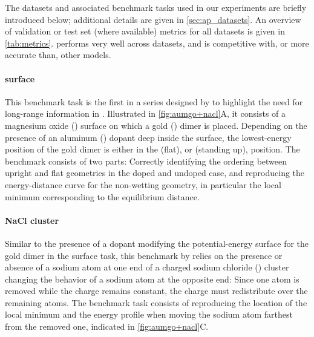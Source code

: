 \documentclass[10pt]{article} %
\begin{document}
\begin{table}
    \caption{Root mean squared errors for energy $E$ and forces $\F$ for datasets and models used in \cref{sub:default}. Where available, a held-out test set was used; otherwise, the validation set was used instead and indicated in the table. The lowest error is indicated in bold, the second lowest is underlined. The second line after each model name indicates the number of short-range (SR) message-passing steps and whether some form of long-range (LR) interactions are included in the model.
    An MAE version of this table is provided in \cref{sec:apx-mae-rmse}.}
    \centering
    
    \label{tab:metrics}
\end{table}

The datasets and associated benchmark tasks used in our experiments are briefly introduced below; additional details are given in \cref{sec:ap_datasets}. An overview of validation or test set (where available) metrics for all datasets is given in \cref{tab:metrics}. \lorem performs very well across datasets, and is competitive with, or more accurate than, other models.

\paragraph{ surface} This benchmark task is the first in a series designed by \cite{kfgb2021} to highlight the need for long-range information in \mlps. Illustrated in \cref{fig:aumgo+nacl}A, it consists of a magnesium oxide () surface on which a gold () dimer is placed. Depending on the presence of an aluminum () dopant deep inside the surface, the lowest-energy position of the gold dimer is either in the  (flat), or  (standing up), position.
The benchmark consists of two parts: Correctly identifying the ordering between upright and flat geometries in the doped and undoped case, and reproducing the energy-distance curve for the non-wetting geometry, in particular the local minimum corresponding to the equilibrium distance.

\paragraph{NaCl cluster} Similar to the presence of a dopant modifying the potential-energy surface for the gold dimer in the  surface task, this benchmark by \cite{kfgb2021} relies on the presence or absence of a sodium atom at one end of a charged sodium chloride () cluster changing the behavior of a sodium atom at the opposite end: Since one atom is removed while the charge remains constant, the charge must redistribute over the remaining atoms.
The benchmark task consists of reproducing the location of the local minimum and the energy profile when moving the sodium atom farthest from the removed one, indicated in \cref{fig:aumgo+nacl}C.
\end{document}
